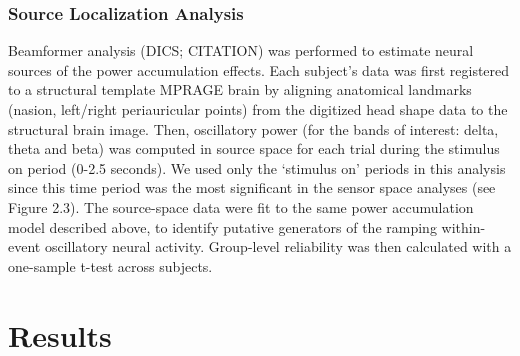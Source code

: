 \subsubsection{Source Localization
Analysis}\label{source-localization-analysis}

Beamformer analysis (DICS; CITATION) was performed to estimate neural
sources of the power accumulation effects. Each subject's data was first
registered to a structural template MPRAGE brain
\autocite{jenkinson_fsl_2012} by aligning anatomical landmarks (nasion,
left/right periauricular points) from the digitized head shape data to
the structural brain image. Then, oscillatory power (for the bands of
interest: delta, theta and beta) was computed in source space for each
trial during the stimulus on period (0-2.5 seconds). We used only the
`stimulus on' periods in this analysis since this time period was the
most significant in the sensor space analyses (see Figure 2.3). The
source-space data were fit to the same power accumulation model
described above, to identify putative generators of the ramping
within-event oscillatory neural activity. Group-level reliability was
then calculated with a one-sample t-test across subjects.

\section{Results}\label{results}

